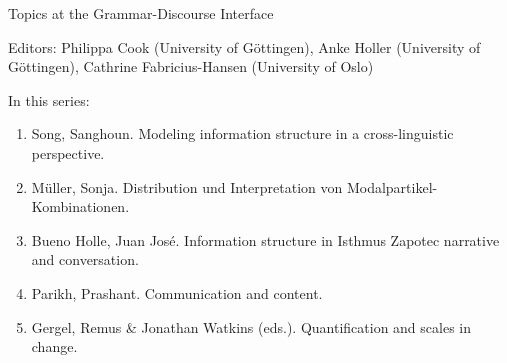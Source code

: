 {\large  Topics at the Grammar-Discourse Interface}

\bigskip

Editors: Philippa Cook (University of Göttingen),
Anke Holler (University of Göttingen),
Cathrine Fabricius-Hansen (University of Oslo)

\bigskip

In this series:

\begin{enumerate}
\item Song, Sanghoun. Modeling information structure in a cross-linguistic perspective.
\item Müller, Sonja. Distribution und Interpretation von Modalpartikel-Kombinationen.
\item Bueno Holle, Juan José. Information structure in Isthmus Zapotec narrative and conversation.
\item Parikh, Prashant. Communication and content.
\item Gergel, Remus \& Jonathan Watkins (eds.). Quantification and scales in change.
\end{enumerate}
